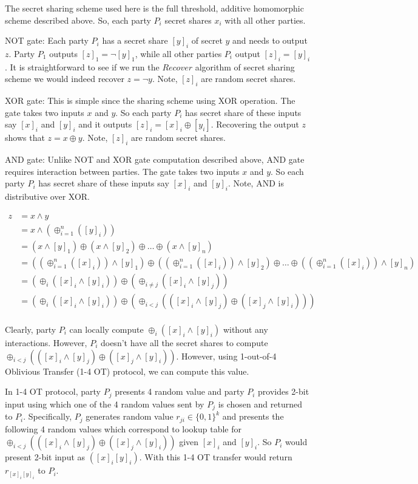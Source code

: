 \documentclass[11pt]{article}
\begin{document}
The secret sharing scheme used here is the full threshold, additive homomorphic scheme described above. So, each party $P_i$ secret shares $x_i$ with all other parties.

NOT gate: Each party $P_i$ has a secret share $[y]_i$ of secret $y$ and needs to output $z$. Party $P_1$ outputs $[z]_1 = \neg [y]_1$, while all other parties $P_i$ output $[z]_i = [y]_i$. It is straightforward to see if we run the $Recover$ algorithm of secret sharing scheme we would indeed recover $z = \neg y$. Note, $[z]_i$ are random secret shares.

XOR gate: This is simple since the sharing scheme using XOR operation. The gate takes two inputs $x$ and $y$. So each party $P_i$ has secret share of these inputs say $[x]_i$ and $[y]_i$ and it outputs $[z]_i = [x]_i \oplus [y_i]$. Recovering the output $z$ shows that $z = x \oplus y$. Note, $[z]_i$ are random secret shares.

AND gate: Unlike NOT and XOR gate computation described above, AND gate requires interaction between parties. The gate takes two inputs $x$ and $y$. So each party $P_i$ has secret share of these inputs say $[x]_i$ and $[y]_i$. Note, AND is distributive over XOR.

\begin{align*}
    z   & = x \land y \\
        & = x \land (\oplus_{i=1}^{n} ([y]_i)) \\
        & = (x \land [y]_1) \oplus (x \land [y]_2) \oplus \dots \oplus (x \land [y]_n) \\
        & = ((\oplus_{i=1}^{n} ([x]_i)) \land [y]_1) \oplus ((\oplus_{i=1}^{n} ([x]_i)) \land [y]_2) \oplus \dots \oplus ((\oplus_{i=1}^{n} ([x]_i)) \land [y]_n) \\
        & = (\oplus_{i} ([x]_i \land [y]_i)) \oplus (\oplus_{i \ne j} ([x]_i \land [y]_j)) \\
        & = (\oplus_{i} ([x]_i \land [y]_i)) \oplus (\oplus_{i < j} (([x]_i \land [y]_j) \oplus ([x]_j \land [y]_i))) \\
\end{align*}

Clearly, party $P_i$ can locally compute $\oplus_{i} ([x]_i \land [y]_i)$ without any interactions. However, $P_i$ doesn't have all the secret shares to compute $\oplus_{i < j} (([x]_i \land [y]_j) \oplus ([x]_j \land [y]_i))$. However, using 1-out-of-4 Oblivious Transfer (1-4 OT) protocol, we can compute this value.

In 1-4 OT protocol, party $P_j$ presents 4 random value and party $P_i$ provides 2-bit input using which one of the 4 random values sent by $P_j$ is chosen and returned to $P_i$. Specifically, $P_j$ generates random value $r_{ji} \in \{0, 1\}^k$ and presents the following 4 random values which correspond to lookup table for $\oplus_{i < j} (([x]_i \land [y]_j) \oplus ([x]_j \land [y]_i))$ given $[x]_i$ and $[y]_i$. So $P_i$ would present 2-bit input as $([x]_i[y]_i)$. With this 1-4 OT transfer would return $r_{[x]_i[y]_i}$ to $P_i$.
\end{document}
